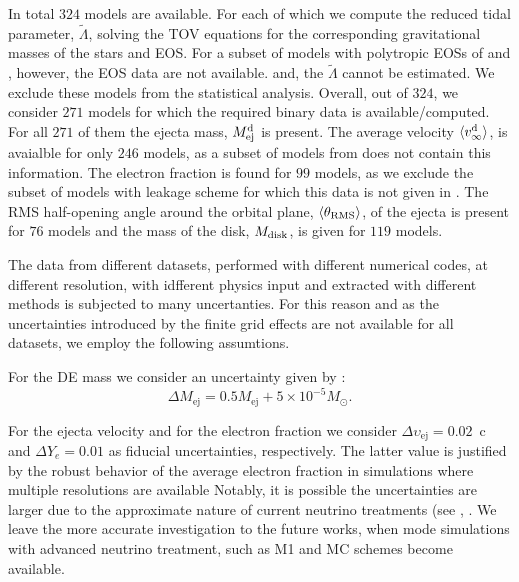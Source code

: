 In total $324$ models are available.
For each of which we compute the reduced tidal parameter, $\tilde{\Lambda}$, 
solving the \ac{TOV} equations for the corresponding gravitational masses of the stars 
and \ac{EOS}. 
For a subset of models with polytropic \acp{EOS} of \citet{Bauswein:2013jpa}
and \citet{Kiuchi:2019lls}, however, the \ac{EOS} data are not available. and, the $\tilde{\Lambda}$ cannot be estimated. We exclude these models from the statistical analysis.
Overall, out of $324$, we consider $271$ models for which the required binary data is available/computed. For all $271$ of them the ejecta mass, $M^{\text{d}}_{\text{ej}}$ is present. The average velocity $\langle v^{\text{d}}_\infty\rangle$, is avaialble for only $246$ models, as a subset of models from \citet{Kiuchi:2019lls} does not contain this information. The electron fraction is found for $99$ models, as we exclude the subset of models with leakage scheme for which this data is not given in \citet{Lehner:2016lxy}. The \ac{RMS} half-opening angle around the orbital plane, $\langle\theta_{\rm RMS}\rangle$, of the ejecta is present for $76$ models and the mass of the disk, $M_{\rm disk}$, is given for $119$ models.

The data from different datasets, performed with different numerical codes, at different resolution,
with idfferent physics input and extracted with different methods is subjected to many uncertanties.
For this reason and as the uncertainties introduced by the finite grid effects are not available for 
all datasets, we employ the following assumtions.

For the \ac{DE} mass we consider an uncertainty given by \citep{Radice:2018pdn}:
\begin{equation}
\Delta M_{\text{ej}} = 0.5M_{\text{ej}} + 5\times10^{-5}M_{\odot}.
\label{eq:ejecta:mej_err}
\end{equation}

For the ejecta velocity and for the electron fraction we consider 
$\Delta \upsilon_{\text{ej}} = 0.02$~c 
and $ \Delta Y_e = 0.01$ as fiducial uncertainties, respectively.
The latter value is justified by the robust behavior of the average electron 
fraction in simulations where multiple resolutions are available
Notably, it is possible the uncertainties are larger due to the approximate nature of current 
neutrino treatments (see \eg, \citep{Foucart:2016rxm,Foucart:2018gis}. 
We leave the more accurate investigation to the future works, when mode simulations
with advanced neutrino treatment, such as M1 and \ac{MC} schemes become available. 


